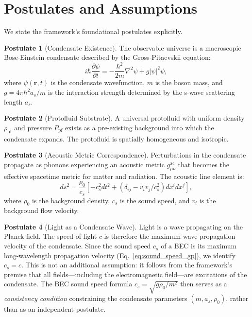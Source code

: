 \documentclass[11pt,a4paper]{article}
\theoremstyle{definition}
\newtheorem{postulate}{Postulate}
\theoremstyle{remark}
\begin{document}
\section{Postulates and Assumptions}
\label{sec:postulates}

We state the framework's foundational postulates explicitly.

\begin{postulate}[Condensate Existence]
\label{post:condensate}
The observable universe is a macroscopic Bose-Einstein condensate described by the Gross-Pitaevskii equation:
\begin{equation}
i\hbar \frac{\partial\psi}{\partial t} = -\frac{\hbar^2}{2m}\nabla^2\psi + g|\psi|^2\psi,
\end{equation}
where $\psi(\mathbf{r},t)$ is the condensate wavefunction, $m$ is the boson mass, and $g = 4\pi\hbar^2 a_s/m$ is the interaction strength determined by the s-wave scattering length $a_s$.
\end{postulate}

\begin{postulate}[Protofluid Substrate]
\label{post:protofluid}
A universal protofluid with uniform density $\rho_{\mathrm{pf}}$ and pressure $P_{\mathrm{pf}}$ exists as a pre-existing background into which the condensate expands. The protofluid is spatially homogeneous and isotropic.
\end{postulate}

\begin{postulate}[Acoustic Metric Correspondence]
\label{post:acoustic_metric}
Perturbations in the condensate propagate as phonons experiencing an acoustic metric $g_{\mu\nu}^{\mathrm{ac}}$ that becomes the effective spacetime metric for matter and radiation. The acoustic line element is:
\begin{equation}
ds^2 = \frac{\rho_0}{c_s}\left[-c_s^2 dt^2 + (\delta_{ij} - v_i v_j/c_s^2)dx^i dx^j\right],
\end{equation}
where $\rho_0$ is the background density, $c_s$ is the sound speed, and $v_i$ is the background flow velocity.
\end{postulate}

\begin{postulate}[Light as a Condensate Wave]
\label{post:relativistic}
Light is a wave propagating on the Planck field. The speed of light $c$ is therefore the maximum wave propagation velocity of the condensate. Since the sound speed $c_s$ of a BEC is its maximum long-wavelength propagation velocity (Eq.~\ref{eq:sound_speed_gp}), we identify $c_s = c$. This is not an additional assumption: it follows from the framework's premise that all fields---including the electromagnetic field---are excitations of the condensate. The BEC sound speed formula $c_s = \sqrt{g\rho_0/m^2}$ then serves as a \emph{consistency condition} constraining the condensate parameters $(m, a_s, \rho_0)$, rather than as an independent postulate.
\end{postulate}
\end{document}
